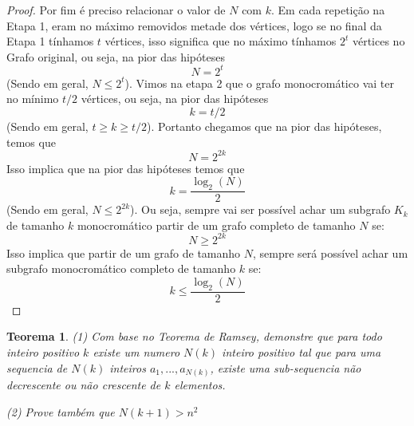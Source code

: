 \documentclass{article}
\newtheorem{teor}{Teorema}[section]
\begin{document}
\begin{proof}
    Por fim é preciso relacionar o valor de $N$ com $k$. Em cada repetição na Etapa 1, eram no máximo removidos metade dos vértices, logo se no final da Etapa 1 tínhamos $t$ vértices, isso significa que no máximo tínhamos $2^t$ vértices no Grafo original, ou seja, na pior das hipóteses
    \[N = 2^t\]
    (Sendo em geral, $N \leq 2^t$). Vimos na etapa 2 que o grafo monocromático vai ter no mínimo $t/2$ vértices, ou seja, na pior das hipóteses
    \[k = t/2\]
    (Sendo em geral, $t \geq k \geq t/2$). Portanto chegamos que na pior das hipóteses, temos que
    \[N = 2^{2k}\]
    Isso implica que na pior das hipóteses temos que
    \[k = \frac{\log_2(N)}{2}\]
    (Sendo em geral, $N \leq 2^{2k}$). Ou seja, sempre vai ser possível achar um subgrafo $K_k$ de tamanho $k$ monocromático partir de um grafo completo de tamanho $N$ se:
    \[N \geq 2^{2k}\]
    Isso implica que partir de um grafo de tamanho $N$, sempre será possível achar um subgrafo monocromático completo de tamanho $k$ se:
    \[k \leq \frac{\log_2(N)}{2}\]
\end{proof}


\begin{teor}
    (1) Com base no \emph{Teorema de Ramsey}, demonstre que para todo inteiro positivo $k$ existe um numero $N(k)$ inteiro positivo tal que para uma sequencia de $N(k)$ inteiros $a_1, ..., a_{N(k)}$, existe uma sub-sequencia não decrescente ou não crescente de $k$ elementos.

    (2) Prove também que $N(k+1) > n^2$
\end{teor}
\end{document}
